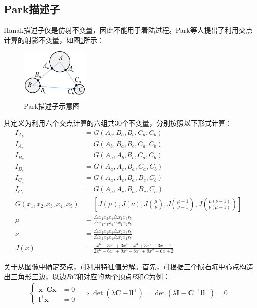 \documentclass{article}
\begin{document}
\subsection{Park描述子}
Hanak描述子仅是仿射不变量，因此不能用于着陆过程。Park\cite{parkRobustCraterTriangle2019}等人提出了利用交点计算的射影不变量，如图\ref{fig:Park}所示：
\begin{figure}[H]
  \centering
  \includegraphics[width=0.3\textwidth]{Park三元组.png}
  \caption{Park描述子示意图}
  \label{fig:Park}
\end{figure}\par
其定义为利用六个交点计算的六组共30个不变量，分别按照以下形式计算：
\begin{align*}
  I_{A_b}&=G(A_c,B_a,B_b,C_a,C_b)\\
  I_{A_c}&=G(A_b,B_a,B_c,C_a,C_b)\\
  I_{B_a}&=G(A_a,A_b,B_c,C_a,C_b)\\
  I_{B_c}&=G(A_a,A_c,B_a,C_a,C_b)\\
  I_{C_a}&=G(A_a,A_c,B_a,B_c,C_b)\\
  I_{C_b}&=G(A_a,A_c,B_a,B_c,C_a)\\
  G(x_1,x_2,x_3,x_4,x_5)&=\left[J(\mu),J(\nu),J\left(\frac{\mu}{\nu}\right),J\left(\frac{\mu-1}{\nu-1}\right),J\left(\frac{\mu(\nu-1)}{\nu(\mu-1)}\right)\right]\\
  \mu& = \frac{\triangle x_1x_2x_4\triangle x_1x_3x_5}{\triangle x_1x_3x_4\triangle x_1x_2x_5}\\
  \nu&=\frac{\triangle x_2x_1x_4\triangle x_2x_3x_5}{\triangle x_2x_3x_4\triangle x_2x_1x_5}\\
  J(x)&=\frac{x^6-3x^5+3x^4-x^3+3x^2-3x+1}{2x^6-6x^5+9x^4-8x^3+9x^2-6x+2}
\end{align*}\par
关于从图像中确定交点，可利用特征值分解。首先，可根据三个陨石坑中心点构造出三角形三边，以边$BC$和对应的两个顶点$B$和$C$为例：
\begin{align*}
  \left\{
  \begin{aligned}
    \mathbf{x^\top Cx}&=0\\
    \mathbf{l^\top x}&=0  
  \end{aligned}
  \right.\implies\det(\lambda\mathbf{C-ll^\top})=\det(\lambda\mathbf{I-C^\mathrm{-1}ll^\top})=0
\end{align*}\par
\end{document}
